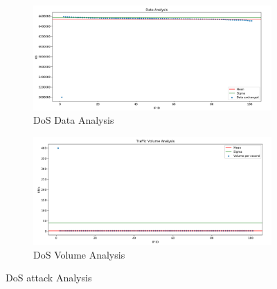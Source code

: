 \begin{figure}[h]
	\begin{subfigure}{0.48\textwidth}
		\includegraphics[width=\textwidth]{imgs/dos_atk-data_analysis.png}
  		\caption{DoS Data Analysis}
  		\label{fig:ddos_data}
	\end{subfigure}
	\hspace*{\fill} %
	\begin{subfigure}{0.48\textwidth}
  		\includegraphics[width=\textwidth]{imgs/dos_atk-volume_analysis.png}
  		\caption{DoS Volume Analysis}
  		\label{fig:dos_volume}
	\end{subfigure}
	\caption{DoS attack Analysis}
	\label{fig:dos_analysis}
\end{figure}

